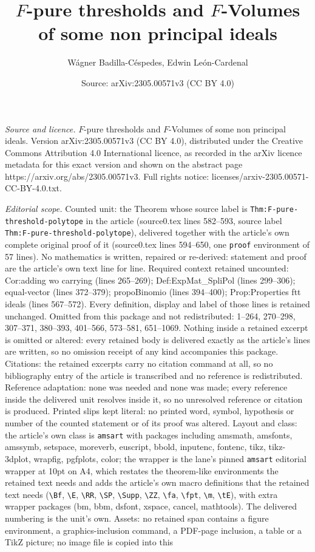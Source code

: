 \documentclass[10pt,a4paper]{amsart}
\title[$F$-pure thresholds and $F$-Volumes of some non principal id]{$F$-pure thresholds and $F$-Volumes of some non principal ideals}
\author{W\'agner Badilla-C\'espedes, Edwin Le\'on-Cardenal}
\date{Source: arXiv:2305.00571v3 (CC BY 4.0)}
\begin{document}
\maketitle

\noindent\emph{Source and licence.} $F$-pure thresholds and $F$-Volumes of some non principal ideals. Version arXiv:2305.00571v3 (CC BY 4.0), distributed under the Creative Commons Attribution 4.0 International licence, as recorded in the arXiv licence metadata for this exact version and shown on the abstract page https://arxiv.org/abs/2305.00571v3. Full rights notice: licenses/arxiv-2305.00571-CC-BY-4.0.txt.\par\smallskip

\noindent\textit{Editorial scope.} Counted unit: the Theorem whose source label is \texttt{Thm:F-pure-threshold-polytope} in the article (source0.tex lines 582--593, source label \texttt{Thm:F-pure-threshold-polytope}), delivered together with the article's own complete original proof of it (source0.tex lines 594--650, one \texttt{proof} environment of 57 lines). No mathematics is written, repaired or re-derived: statement and proof are the article's own text line for line. Required context retained uncounted: Cor:adding wo carrying (lines 265--269); Def:ExpMat\_SpliPol (lines 299--306); equal-vector (lines 372--379); propoBinomio (lines 394--400); Prop:Properties ftt ideals (lines 567--572). Every definition, display and label of those lines is retained unchanged. Omitted from this package and not redistributed: 1--264, 270--298, 307--371, 380--393, 401--566, 573--581, 651--1069. Nothing inside a retained excerpt is omitted or altered: every retained body is delivered exactly as the article's lines are written, so no omission receipt of any kind accompanies this package. Citations: the retained excerpts carry no citation command at all, so no bibliography entry of the article is transcribed and no reference is redistributed. Reference adaptation: none was needed and none was made; every reference inside the delivered unit resolves inside it, so no unresolved reference or citation is produced. Printed slips kept literal: no printed word, symbol, hypothesis or number of the counted statement or of its proof was altered. Layout and class: the article's own class is \texttt{amsart} with packages including amsmath, amsfonts, amssymb, setspace, moreverb, euscript, bbold, inputenc, fontenc, tikz, tikz-3dplot, wrapfig, pgfplots, color; the wrapper is the lane's pinned \texttt{amsart} editorial wrapper at 10pt on A4, which restates the theorem-like environments the retained text needs and adds the article's own macro definitions that the retained text needs (\texttt{\textbackslash Bf}, \texttt{\textbackslash E}, \texttt{\textbackslash RR}, \texttt{\textbackslash SP}, \texttt{\textbackslash Supp}, \texttt{\textbackslash ZZ}, \texttt{\textbackslash fa}, \texttt{\textbackslash fpt}, \texttt{\textbackslash m}, \texttt{\textbackslash tE}), with extra wrapper packages (bm, bbm, dsfont, xspace, cancel, mathtools). The delivered numbering is the unit's own. Assets: no retained span contains a figure environment, a graphics-inclusion command, a PDF-page inclusion, a table or a TikZ picture; no image file is copied into this 
\end{document}
